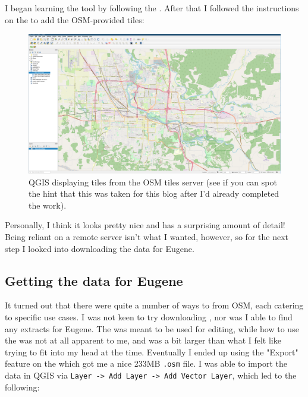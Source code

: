 \documentclass{article}
\begin{document}
I began learning the tool by following the .  After that I followed the instructions on the  to add the OSM-provided tiles:

\begin{figure}
\includegraphics{files/blog/2022_04_17_generating_openstreetmap_tiles_for_offline_slippy_maps/2022_04_17_qgis.png}
\caption{QGIS displaying tiles from the OSM tiles server (see if you can spot the hint that this was taken for this blog after I'd already completed the work).}
\end{figure}

Personally, I think it looks pretty nice and has a surprising amount of detail!  Being reliant on a remote server isn't what I wanted, however, so for the next step I looked into downloading the data for Eugene.

\subsection{Getting the data for Eugene}
It turned out that there were quite a number of ways to  from OSM, each catering to specific use cases.  I was not keen to try downloading , nor was I able to find any extracts for Eugene.  The  was meant to be used for editing, while how to use the  was not at all apparent to me, and  was a bit larger than what I felt like trying to fit into my head at the time.  Eventually I ended up using the "Export" feature on the  which got me a nice 233MB \texttt{.osm} file.  I was able to import the data in QGIS via \texttt{Layer -> Add Layer -> Add Vector Layer}, which led to the following:
\end{document}
